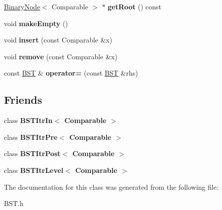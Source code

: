 \begin{DoxyCompactItemize}
\item 
\hyperlink{class_binary_node}{Binary\+Node}$<$ Comparable $>$ $\ast$ {\bfseries get\+Root} () const \hypertarget{class_b_s_t_a9063d7dca4f958d24a78c14c091914c5}{}\label{class_b_s_t_a9063d7dca4f958d24a78c14c091914c5}

\item 
void {\bfseries make\+Empty} ()\hypertarget{class_b_s_t_a050d829503a88714c4ad0773cf6d3af6}{}\label{class_b_s_t_a050d829503a88714c4ad0773cf6d3af6}

\item 
void {\bfseries insert} (const Comparable \&x)\hypertarget{class_b_s_t_a2b117df6521c7d61dac75ff2c938bae7}{}\label{class_b_s_t_a2b117df6521c7d61dac75ff2c938bae7}

\item 
void {\bfseries remove} (const Comparable \&x)\hypertarget{class_b_s_t_a6f01a0b44daf82a42022b6eb4c0df7a2}{}\label{class_b_s_t_a6f01a0b44daf82a42022b6eb4c0df7a2}

\item 
const \hyperlink{class_b_s_t}{B\+ST} \& {\bfseries operator=} (const \hyperlink{class_b_s_t}{B\+ST} \&rhs)\hypertarget{class_b_s_t_aa80c39f454c89d4a202be3d1445823f3}{}\label{class_b_s_t_aa80c39f454c89d4a202be3d1445823f3}

\end{DoxyCompactItemize}
\subsection*{Friends}
\begin{DoxyCompactItemize}
\item 
class {\bfseries B\+S\+T\+Itr\+In$<$ Comparable $>$}\hypertarget{class_b_s_t_aab3993acac2ab24a0b59edb0c3acc775}{}\label{class_b_s_t_aab3993acac2ab24a0b59edb0c3acc775}

\item 
class {\bfseries B\+S\+T\+Itr\+Pre$<$ Comparable $>$}\hypertarget{class_b_s_t_a45a55df6f11541416d4ea7684c575c1a}{}\label{class_b_s_t_a45a55df6f11541416d4ea7684c575c1a}

\item 
class {\bfseries B\+S\+T\+Itr\+Post$<$ Comparable $>$}\hypertarget{class_b_s_t_a5dc153694be266f6e772659486219da7}{}\label{class_b_s_t_a5dc153694be266f6e772659486219da7}

\item 
class {\bfseries B\+S\+T\+Itr\+Level$<$ Comparable $>$}\hypertarget{class_b_s_t_a26ff00bc0d87069aed877f10fd3c80a8}{}\label{class_b_s_t_a26ff00bc0d87069aed877f10fd3c80a8}

\end{DoxyCompactItemize}


The documentation for this class was generated from the following file\+:\begin{DoxyCompactItemize}
\item 
B\+S\+T.\+h\end{DoxyCompactItemize}
